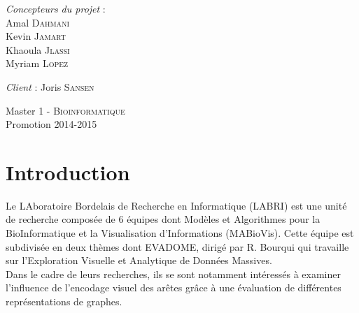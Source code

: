 \documentclass[a4paper]{report}
\begin{document}
\begin{center}
\begin{minipage}{0.4\textwidth}
\begin{flushleft} \large
\emph{Concepteurs du projet} :\\
\vspace{1\baselineskip}
        Amal \textsc{Dahmani}\\
        Kevin \textsc{Jamart}\\
        Khaoula \textsc{Jlassi}\\
        Myriam \textsc{Lopez}\\
\end{flushleft}
\end{minipage}
\begin{minipage}{0.4\textwidth}
\begin{flushright} \large
\emph{Client} : Joris \textsc{Sansen}\\
\end{flushright}
\end{minipage}

\begin{center}

\large
Master 1 - \textsc{Bioinformatique} \\
Promotion 2014-2015

\end{center}

\end{center}

\newpage


\tableofcontents

\newpage
{}


\section*{Introduction}

Le LAboratoire Bordelais de Recherche en Informatique (LABRI)\cite{ref0} est une unité de recherche composée de 6 équipes dont Modèles et Algorithmes  pour la BioInformatique et la Visualisation d'Informations (MABioVis)\cite{ref1}.
 Cette équipe est subdivisée en deux thèmes dont EVADOME\cite{ref2}, dirigé par R. Bourqui qui travaille sur l'Exploration Visuelle et Analytique de Données Massives.\\
 Dans le cadre de leurs recherches, ils se sont notamment intéressés à examiner l'influence de l'encodage visuel des arêtes grâce à une évaluation de différentes représentations de graphes.\\
\end{document}
